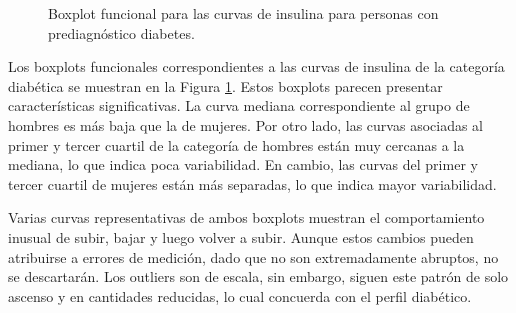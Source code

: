 \begin{figure}[H]
 \centering
    \caption{Boxplot funcional para las curvas de insulina para personas con prediagnóstico diabetes.}
    \label{fig:insulinaDiabetes}
\end{figure}

Los boxplots funcionales correspondientes a las curvas de insulina de la categoría diabética se muestran en la Figura \ref{fig:insulinaDiabetes}. Estos boxplots parecen presentar características significativas. La curva mediana correspondiente al grupo de hombres es más baja que la de mujeres. Por otro lado, las curvas asociadas al primer y tercer cuartil de la categoría de hombres están muy cercanas a la mediana, lo que indica poca variabilidad. En cambio, las curvas del primer y tercer cuartil de mujeres están más separadas, lo que indica mayor variabilidad.

Varias curvas representativas de ambos boxplots muestran el comportamiento inusual de subir, bajar y luego volver a subir. Aunque estos cambios pueden atribuirse a errores de medición, dado que no son extremadamente abruptos, no se descartarán. Los outliers son de escala, sin embargo, siguen este patrón de solo ascenso y en cantidades reducidas, lo cual concuerda con el perfil diabético.


